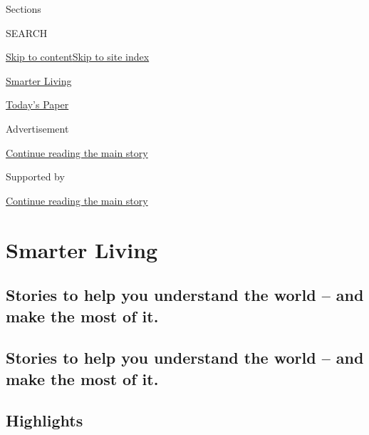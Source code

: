 Sections

SEARCH

\protect\hyperlink{site-content}{Skip to
content}\protect\hyperlink{site-index}{Skip to site index}

\href{https://www.nytimes.com/section/smarter-living}{Smarter Living}

\href{https://myaccount.nytimes.com/auth/login?response_type=cookie\&client_id=vi}{}

\href{https://www.nytimes.com/section/todayspaper}{Today's Paper}

Advertisement

\protect\hyperlink{after-top}{Continue reading the main story}

Supported by

\protect\hyperlink{after-sponsor}{Continue reading the main story}

\hypertarget{smarter-living}{%
\section{Smarter Living}\label{smarter-living}}

\hypertarget{stories-to-help-you-understand-the-world--and-make-the-most-of-it}{%
\subsection{Stories to help you understand the world -- and make the
most of
it.}\label{stories-to-help-you-understand-the-world--and-make-the-most-of-it}}

\hypertarget{stories-to-help-you-understand-the-world--and-make-the-most-of-it-1}{%
\subsection{Stories to help you understand the world -- and make the
most of
it.}\label{stories-to-help-you-understand-the-world--and-make-the-most-of-it-1}}

\hypertarget{highlights}{%
\subsection{Highlights}\label{highlights}}

